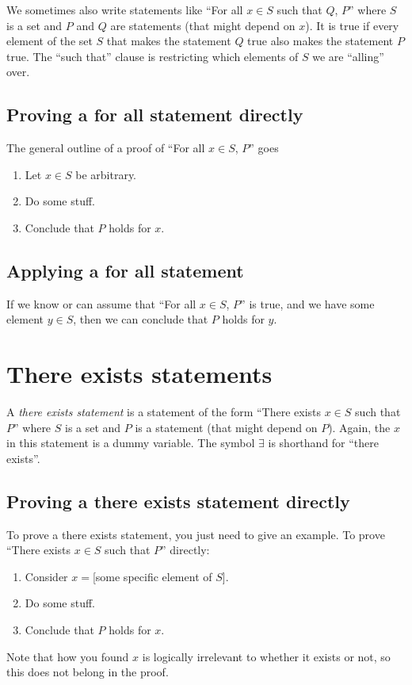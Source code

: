 \documentclass[12pt]{amsart}
\begin{document}
We sometimes also write statements like ``For all $x\in S$ such that $Q$, $P$'' where $S$ is a set and $P$ and $Q$ are statements (that might depend on $x$). It is true if every element of the set $S$ that makes the statement $Q$ true also makes the statement $P$ true. The ``such that'' clause is restricting which elements of $S$ we are ``alling'' over.


\subsection*{Proving a for all statement directly} The general outline of a proof of ``For all $x\in S$, $P$'' goes
\begin{enumerate}
\item Let $x\in S$ be arbitrary.
\item Do some stuff.
\item Conclude that $P$ holds for $x$.
\end{enumerate}




\subsection*{Applying a for all statement} If we know or can assume that ``For all $x\in S$, $P$'' is true, and we have some element $y\in S$, then we can conclude that $P$ holds for $y$.

\section*{There exists statements} A \emph{there exists statement} is a statement of the form ``There exists $x\in S$ such that $P$'' where $S$ is a set and $P$ is a statement (that might depend on $P$). Again, the $x$ in this statement is a dummy variable. The symbol $\exists$ is shorthand for ``there exists''.

\subsection*{Proving a there exists statement directly} To prove a there exists statement, you just need to give an example. To prove ``There exists $x\in S$ such that $P$'' directly:
\begin{enumerate}
\item Consider $x=$[some specific element of $S$].
\item Do some stuff.
\item Conclude that $P$ holds for $x$.
\end{enumerate}
Note that how you found $x$ is logically irrelevant to whether it exists or not, so this does not belong in the proof.
\end{document}

